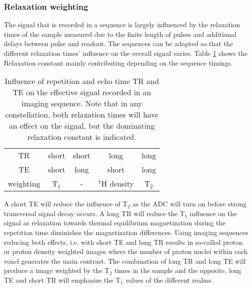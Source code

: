        \subsubsection{Relaxation weighting}
        \label{sec:theory:relaxation}
        The signal that is recorded in a sequence is largely influenced by the relaxation times of the sample measured due to the finite length of pulses and additional delays between pulse and readout. The sequences can be adapted so that the different relaxation times' influence on the overall signal varies. Table \ref{tab:theory:relaxationWeighting} shows the Relaxation constant mainly contributing depending on the sequence timings.
        \begin{table}
            \centering
            \begin{tabular}{|c|cccc|}
                \hline
                TR & short & short & long & long \\
                TE & short & long & short & long \\
                \hline
                weighting  & T$_1$ & - & $^1$H density & T$_2$ \\
                \hline
            \end{tabular}
            \caption[Relaxation weighing]{Influence of repetition and echo time TR and TE on the effective signal recorded in an imaging sequence. Note that in any constellation, both relaxation times will have an effect on the signal, but the dominating relaxation constant is indicated.}
            \label{tab:theory:relaxationWeighting}
        \end{table}
        A short TE will reduce the influence of T$_2$ as the ADC will turn on before strong transversal signal decay occurs. A long TR will reduce the T$_1$ influence on the signal as relaxation towards thermal equilibrium magnetization during the repetition time diminishes the magnetization differences. Using imaging sequences reducing both effects, i.e. with short TE and long TR results in so-called proton or proton density weighted images where the number of proton nuclei within each voxel generates the main contrast. The combination of long TR and long TE will produce a image weighted by the T$_2$ times in the sample and the opposite, long TE and short TR will emphasize the T$_1$ values of the different realms.
